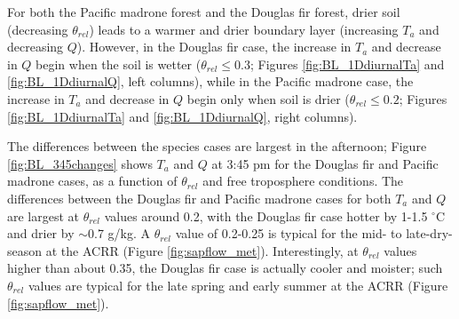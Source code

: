
For both the Pacific madrone forest and the Douglas fir forest, drier soil (decreasing $\theta_{rel}$) leads to a warmer and drier boundary layer (increasing $T_a$ and decreasing $Q$).  However, in the Douglas fir case, the increase in $T_a$ and decrease in $Q$ begin when the soil is wetter ($\theta_{rel} \le 0.3$; Figures \ref{fig:BL_1DdiurnalTa} and \ref{fig:BL_1DdiurnalQ}, left columns), while in the Pacific madrone case, the increase in $T_a$ and decrease in $Q$ begin only when soil is drier ($\theta_{rel} \le 0.2$; Figures \ref{fig:BL_1DdiurnalTa} and \ref{fig:BL_1DdiurnalQ}, right columns).  

The differences between the species cases are largest in the afternoon; Figure \ref{fig:BL_345changes} shows $T_a$ and $Q$ at 3:45 pm for the Douglas fir and Pacific madrone cases, as a function of $\theta_{rel}$ and free troposphere conditions.  The differences between the Douglas fir and Pacific madrone cases for both $T_a$ and $Q$ are largest at $\theta_{rel}$ values around 0.2, with the Douglas fir case hotter by 1-1.5 $^\circ$C and drier by $\sim$0.7 g/kg.  A $\theta_{rel}$ value of 0.2-0.25 is typical for the mid- to late-dry-season at the ACRR (Figure \ref{fig:sapflow_met}). Interestingly, at $\theta_{rel}$ values higher than about 0.35, the Douglas fir case is actually cooler and moister; such $\theta_{rel}$ values are typical for the late spring and early summer at the ACRR (Figure \ref{fig:sapflow_met}).

